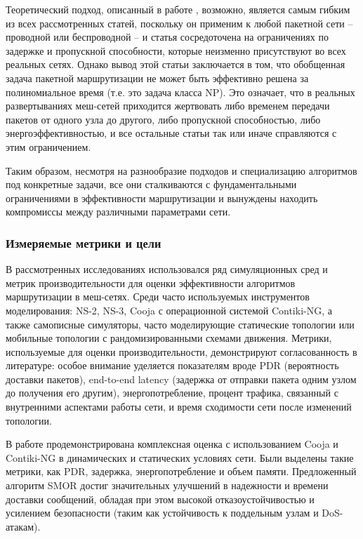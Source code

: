 \documentclass[%
]{report}
\begin{document}
Теоретический подход, описанный в работе
\textcite{DIIANNI1998131}, возможно, является самым гибким
из всех рассмотренных статей, поскольку он применим к
любой пакетной сети -- проводной или беспроводной -- и
статья сосредоточена на ограничениях по задержке
и пропускной способности, которые неизменно
присутствуют во всех реальных сетях.
Однако вывод этой статьи заключается в том,
что обобщенная задача пакетной маршрутизации не может быть
эффективно решена за полиномиальное время
(т.е. это задача класса NP).
Это означает, что в реальных развертываниях меш-сетей
приходится жертвовать либо временем передачи
пакетов от одного узла до другого,
либо пропускной способностью,
либо энергоэффективностью,
и все остальные статьи так или иначе справляются
с этим ограничением.

Таким образом, несмотря на разнообразие подходов
и специализацию алгоритмов под конкретные задачи,
все они сталкиваются с фундаментальными ограничениями
в эффективности маршрутизации и вынуждены находить
компромиссы между различными параметрами сети.

\subsubsection{Измеряемые метрики и цели}\label{evaluation-metrics-and-targets}


В рассмотренных исследованиях использовался
ряд симуляционных сред и метрик производительности
для оценки эффективности алгоритмов маршрутизации в меш-сетях.
Среди часто используемых инструментов моделирования:
NS-2, NS-3, Cooja с операционной системой Contiki-NG,
а также самописные симуляторы,
часто моделирующие статические топологии или
мобильные топологии с рандомизированными схемами движения.
Метрики, используемые для оценки производительности,
демонстрируют согласованность в литературе:
особое внимание уделяется показателям вроде
PDR (вероятность доставки пакетов),
end-to-end latency (задержка от отправки пакета одним узлом до получения его другим),
энергопотребление,
процент трафика, связанный с внутренними аспектами работы сети,
и время сходимости сети после изменений топологии.

В работе \textcite{KRENTZ202457} продемонстрирована
комплексная оценка с использованием
Cooja и Contiki-NG в динамических и статических условиях сети.
Были выделены такие метрики, как PDR,
задержка, энергопотребление и объем памяти.
Предложенный алгоритм SMOR достиг значительных
улучшений в надежности и времени доставки сообщений,
обладая при этом высокой отказоустойчивостью и усилением
безопасности (таким как устойчивость
к поддельным узлам и DoS-атакам).
\end{document}
